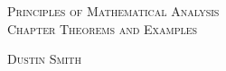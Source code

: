 \documentclass[dvipsnames,svgnames,x11names]{scrbook}%
\begin{document}
\pagecolor{PaleGreen1}
\begin{center}
  \begin{center}
  \vspace*{\fill}
  \textsc{\LARGE Principles of Mathematical Analysis\\Chapter Theorems and Examples}
  \bigskip

  \textsc{\LARGE Dustin Smith}
  \vspace*{\fill}
\end{center}
\end{center}

\newpage

\tableofcontents

\newpage


\end{document}
